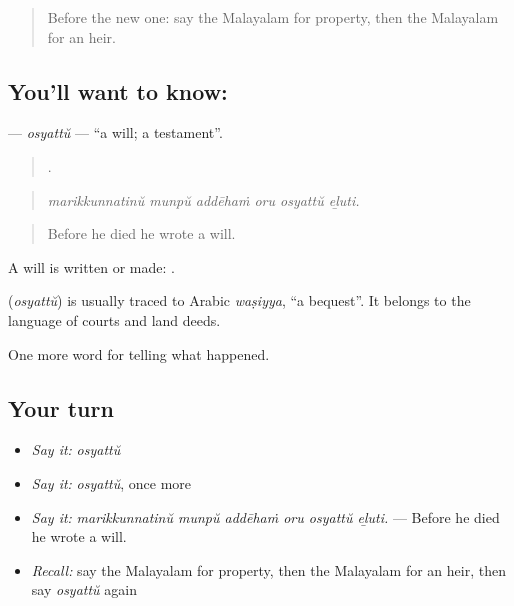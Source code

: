 \label{lesson:ML-C394-osyattu}



\begin{quote}
Before the new one: say the Malayalam for property, then the Malayalam for an heir.
\end{quote}

\subsection*{You'll want to know: }
\textbf{} — \emph{osyattŭ} — \textquotedblleft{}a will; a testament\textquotedblright{}.

\begin{quote}
     .
\end{quote}

\begin{quote}
\emph{marikkunnatinŭ munpŭ addēhaṁ oru osyattŭ eḻuti.}
\end{quote}

\begin{quote}
Before he died he wrote a will.
\end{quote}

A will is written or made:  .

\begin{cousinweb}
\textbf{} (\emph{osyattŭ}) is usually traced to Arabic \emph{waṣiyya}, \textquotedblleft{}a bequest\textquotedblright{}. It belongs to the language of courts and land deeds.
\end{cousinweb}

\begin{grammarlens}[title={What you've built}]
One more word for telling what happened.
\end{grammarlens}

\subsection*{Your turn}
\begin{itemize}
\raggedright
  \item \emph{Say it:} \emph{osyattŭ}
  \item \emph{Say it:} \emph{osyattŭ}, once more
  \item \emph{Say it:} \emph{marikkunnatinŭ munpŭ addēhaṁ oru osyattŭ eḻuti.} — Before he died he wrote a will.
  \item \emph{Recall:} say the Malayalam for property, then the Malayalam for an heir, then say \emph{osyattŭ} again
\end{itemize}

